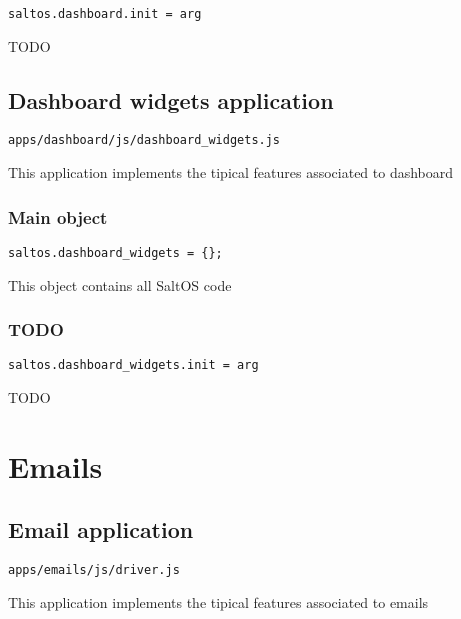 \documentclass[a4paper]{article}
\begin{document}
\begin{lstlisting}
saltos.dashboard.init = arg
\end{lstlisting}

TODO

\hypertarget{toc41}{}
\subsection{Dashboard widgets application}

\begin{lstlisting}
apps/dashboard/js/dashboard_widgets.js
\end{lstlisting}

This application implements the tipical features associated to dashboard

\hypertarget{toc42}{}
\subsubsection{Main object}

\begin{lstlisting}
saltos.dashboard_widgets = {};
\end{lstlisting}

This object contains all SaltOS code

\hypertarget{toc43}{}
\subsubsection{TODO}

\begin{lstlisting}
saltos.dashboard_widgets.init = arg
\end{lstlisting}

TODO


\hypertarget{toc44}{}
\section{Emails}

\hypertarget{toc45}{}
\subsection{Email application}

\begin{lstlisting}
apps/emails/js/driver.js
\end{lstlisting}

This application implements the tipical features associated to emails

\hypertarget{toc46}{}
\end{document}
